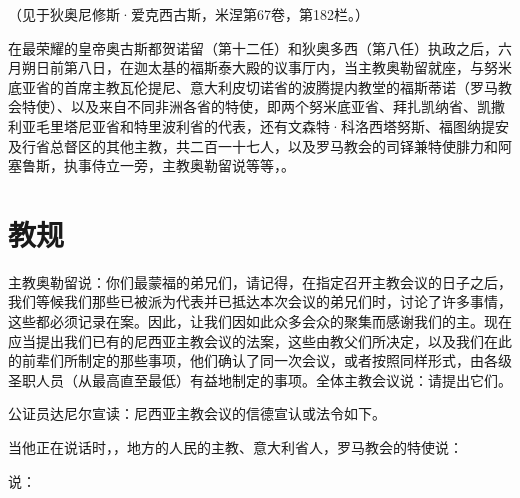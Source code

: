 （见于狄奥尼修斯·爱克西古斯，米涅第67卷，第182栏。）\par

在最荣耀的皇帝奥古斯都贺诺留（第十二任）和狄奥多西（第八任）执政之后，六月朔日前第八日，在迦太基的福斯泰大殿的议事厅内，当主教奥勒留就座，与努米底亚省的首席主教瓦伦提尼、意大利皮切诺省的波腾提内教堂的福斯蒂诺（罗马教会特使）、以及来自不同非洲各省的特使，即两个努米底亚省、拜扎凯纳省、凯撒利亚毛里塔尼亚省和特里波利省的代表，还有文森特·科洛西塔努斯、福图纳提安及行省总督区的其他主教，共二百一十七人，以及罗马教会的司铎兼特使腓力和阿塞鲁斯，执事侍立一旁，主教奥勒留说等等，。\par


\section{教规}

主教奥勒留说：你们最蒙福的弟兄们，请记得，在指定召开主教会议的日子之后，我们等候我们那些已被派为代表并已抵达本次会议的弟兄们时，讨论了许多事情，这些都必须记录在案。因此，让我们因如此众多会众的聚集而感谢我们的主。现在应当提出我们已有的尼西亚主教会议的法案，这些由教父们所决定，以及我们在此的前辈们所制定的那些事项，他们确认了同一次会议，或者按照同样形式，由各级圣职人员（从最高直至最低）有益地制定的事项。全体主教会议说：请提出它们。\par

公证员达尼尔宣读：尼西亚主教会议的信德宣认或法令如下。\par

当他正在说话时，，地方的人民的主教、意大利省人，罗马教会的特使说：\par

说：\par

